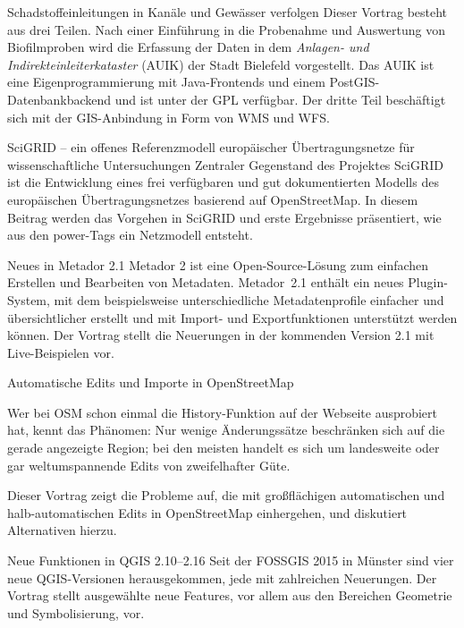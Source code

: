 %
{Schadstoffeinleitungen in Kanäle und Gewässer verfolgen}%
{}%
{Dieser Vortrag besteht aus drei Teilen.
Nach einer Einführung in die Probenahme und Auswertung von Biofilmproben
wird die Erfassung der Daten in dem \emph{Anlagen- und Indirekteinleiterkataster} (AUIK) der Stadt Bielefeld
vorgestellt. Das AUIK ist eine Eigenprogrammierung mit Java-Frontends und einem
PostGIS-Datenbank\-backend und ist unter der GPL verfügbar.
Der dritte Teil beschäftigt sich mit der GIS-Anbindung in Form von WMS und WFS.
}

%
{SciGRID -- ein offenes Referenzmodell europäischer Übertragungsnetze für wissenschaftliche Untersuchungen}%
{}%
{Zentraler Gegenstand  des Projektes SciGRID ist die Entwicklung eines frei verfügbaren
und gut dokumentierten Modells des europäischen Übertragungsnetzes basierend auf
OpenStreetMap. In diesem Beitrag werden das Vorgehen in SciGRID und erste
Ergebnisse präsentiert, wie aus den power-Tags ein Netzmodell entsteht.}

%
{Neues in Metador 2.1}%
{}%
{Metador 2 ist eine Open-Source-Lösung zum einfachen Erstellen und Bearbeiten von Metadaten.
Metador~2.1 enthält ein neues Plugin-System, mit dem beispielsweise unterschiedliche Metadatenprofile
einfacher und übersichtlicher erstellt und mit Import- und Exportfunktionen unterstützt werden können.
Der Vortrag stellt die Neuerungen in der kommenden Version 2.1 mit Live-Beispielen vor.}

%
{Automatische Edits und Importe in OpenStreetMap}%
{}%
{Wer bei OSM schon einmal die History-Funktion auf der
Webseite ausprobiert hat, kennt das Phänomen: Nur wenige Änderungssätze
beschränken sich auf die gerade angezeigte Region; bei den meisten
handelt es sich um landesweite oder gar weltumspannende Edits von
zweifelhafter Güte.

Dieser Vortrag zeigt die Probleme auf, die mit großflächigen automatischen und halb-automatischen Edits in OpenStreetMap einhergehen, und diskutiert Alternativen hierzu. }

%
{Neue Funktionen in QGIS 2.10--2.16}%
{}%
{Seit der FOSSGIS 2015 in Münster sind vier neue QGIS-Versionen herausgekommen,
jede mit zahlreichen Neuerungen. Der Vortrag stellt ausgewählte neue Features,
vor allem aus den Bereichen Geometrie und Symbolisierung, vor.}

